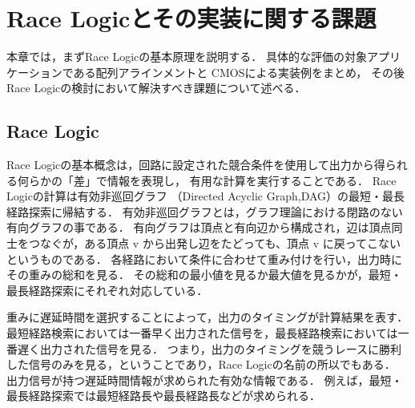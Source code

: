 \chapter{Race Logicとその実装に関する課題}
本章では，まずRace Logicの基本原理を説明する．
具体的な評価の対象アプリケーションである配列アラインメントと
CMOSによる実装例をまとめ，
その後Race Logicの検討において解決すべき課題について述べる．

\section{Race Logic}
Race Logicの基本概念は，回路に設定された競合条件を使用して出力から得られる何らかの「差」で情報を表現し，
有用な計算を実行することである．
Race Logicの計算は有効非巡回グラフ
（Directed Acyclic Graph,DAG）の最短・最長経路探索に帰結する．
有効非巡回グラフとは，グラフ理論における閉路のない有向グラフの事である．
有向グラフは頂点と有向辺から構成され，辺は頂点同士をつなぐが，ある頂点 v から出発し辺をたどっても、頂点 v に戻ってこないというものである．
各経路において条件に合わせて重み付けを行い，出力時にその重みの総和を見る．
その総和の最小値を見るか最大値を見るかが，最短・最長経路探索にそれぞれ対応している．

重みに遅延時間を選択することによって，出力のタイミングが計算結果を表す．
最短経路検索においては一番早く出力された信号を，最長経路検索においては一番遅く出力された信号を見る．
つまり，出力のタイミングを競うレースに勝利した信号のみを見る，ということであり，Race Logicの名前の所以でもある．
出力信号が持つ遅延時間情報が求められた有効な情報である．
例えば，最短・最長経路探索では最短経路長や最長経路長などが求められる．

